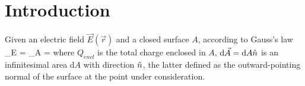 \section{Introduction}
Given an electric field $\vec{E}(\vec{r})$ and a closed surface $A$, according to Gauss's law
\be\label{gauss-law}
\Phi_E = \oiint_A  \cdot {} =
\ee
where $Q_{encl}$ is the total charge enclosed in $A$, $\mathrm{d}\vec{A}=\mathrm{d}A\hat{n}$ is an infinitesimal area $\mathrm{d}A$ with
direction $\hat{n}$, the latter defined as the outward-pointing normal of the surface at the point under consideration.
